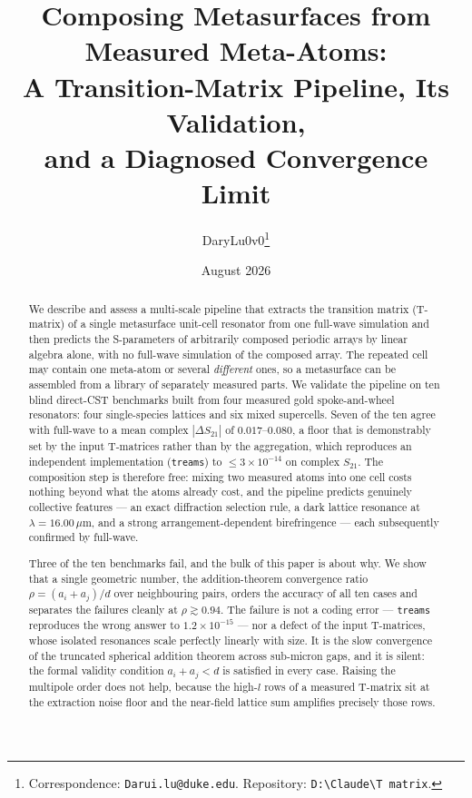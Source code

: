 \documentclass[11pt,a4paper]{article}
\title{\bfseries Composing Metasurfaces from Measured Meta-Atoms:\\
A Transition-Matrix Pipeline, Its Validation,\\
and a Diagnosed Convergence Limit}
\author{DaryLu0v0\thanks{Correspondence: \texttt{Darui.lu@duke.edu}.
Repository: \texttt{D:\textbackslash Claude\textbackslash T matrix}.}}
\date{August 2026}
\newcommand{\um}{\ensuremath{\,\mu\mathrm{m}}}
\theoremstyle{plain}
\theoremstyle{definition}
\begin{document}
\maketitle

\begin{abstract}
\noindent
We describe and assess a multi-scale pipeline that extracts the transition matrix
(T-matrix) of a single metasurface unit-cell resonator from one full-wave
simulation and then predicts the S-parameters of arbitrarily composed periodic
arrays by linear algebra alone, with no full-wave simulation of the composed
array. The repeated cell may contain one meta-atom or several \emph{different}
ones, so a metasurface can be assembled from a library of separately measured
parts. We validate the pipeline on ten blind direct-CST benchmarks built from
four measured gold spoke-and-wheel resonators: four single-species lattices and
six mixed supercells. Seven of the ten agree with full-wave to a mean complex
$|\Delta S_{21}|$ of $0.017$--$0.080$, a floor that is demonstrably set by the
input T-matrices rather than by the aggregation, which reproduces an independent
implementation (\texttt{treams}) to $\le 3\times10^{-14}$ on complex $S_{21}$.
The composition step is therefore free: mixing two measured atoms into one cell
costs nothing beyond what the atoms already cost, and the pipeline predicts
genuinely collective features --- an exact diffraction selection rule, a dark
lattice resonance at $\lambda = 16.00\um$, and a strong arrangement-dependent
birefringence --- each subsequently confirmed by full-wave.

Three of the ten benchmarks fail, and the bulk of this paper is about why. We
show that a single geometric number, the addition-theorem convergence ratio
$\rho = (a_i + a_j)/d$ over neighbouring pairs, orders the accuracy of all ten
cases and separates the failures cleanly at $\rho \gtrsim 0.94$. The failure is
not a coding error --- \texttt{treams} reproduces the wrong answer to
$1.2\times10^{-15}$ --- nor a defect of the input T-matrices, whose isolated
resonances scale perfectly linearly with size. It is the slow convergence of the
truncated spherical addition theorem across sub-micron gaps, and it is silent:
the formal validity condition $a_i + a_j < d$ is satisfied in every case.
Raising the multipole order does not help, because the high-$l$ rows of a
measured T-matrix sit at the extraction noise floor and the near-field lattice
sum amplifies precisely those rows.


\end{abstract}
\end{document}
